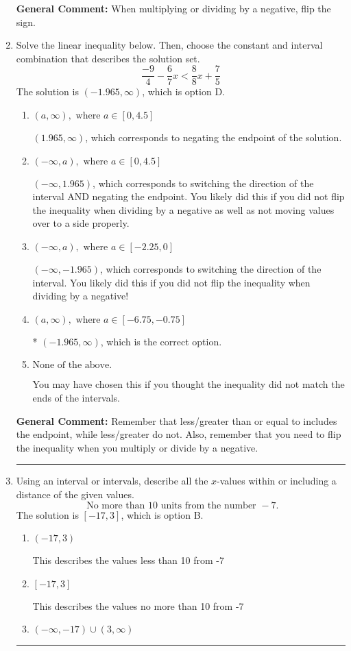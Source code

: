 \documentclass{extbook}[14pt]
\newcommand{\litem}[1]{\item #1

\rule{\textwidth}{0.4pt}}
\begin{document}
\begin{enumerate}
{\textbf{General Comment:} When multiplying or dividing by a negative, flip the sign.
}
\litem{
Solve the linear inequality below. Then, choose the constant and interval combination that describes the solution set.
\[ \frac{-9}{4} - \frac{6}{7} x < \frac{8}{8} x + \frac{7}{5} \]The solution is \( (-1.965, \infty) \), which is option D.\begin{enumerate}[label=\Alph*.]
\item \( (a, \infty), \text{ where } a \in [0, 4.5] \)

 $(1.965, \infty)$, which corresponds to negating the endpoint of the solution.
\item \( (-\infty, a), \text{ where } a \in [0, 4.5] \)

 $(-\infty, 1.965)$, which corresponds to switching the direction of the interval AND negating the endpoint. You likely did this if you did not flip the inequality when dividing by a negative as well as not moving values over to a side properly.
\item \( (-\infty, a), \text{ where } a \in [-2.25, 0] \)

 $(-\infty, -1.965)$, which corresponds to switching the direction of the interval. You likely did this if you did not flip the inequality when dividing by a negative!
\item \( (a, \infty), \text{ where } a \in [-6.75, -0.75] \)

* $(-1.965, \infty)$, which is the correct option.
\item \( \text{None of the above}. \)

You may have chosen this if you thought the inequality did not match the ends of the intervals.
\end{enumerate}

\textbf{General Comment:} Remember that less/greater than or equal to includes the endpoint, while less/greater do not. Also, remember that you need to flip the inequality when you multiply or divide by a negative.
}
\litem{
Using an interval or intervals, describe all the $x$-values within or including a distance of the given values.
\[ \text{ No more than } 10 \text{ units from the number } -7. \]The solution is \( [-17, 3] \), which is option B.\begin{enumerate}[label=\Alph*.]
\item \( (-17, 3) \)

This describes the values less than 10 from -7
\item \( [-17, 3] \)

This describes the values no more than 10 from -7
\item \( (-\infty, -17) \cup (3, \infty) \)


\end{enumerate}}
\end{enumerate}
\end{document}
